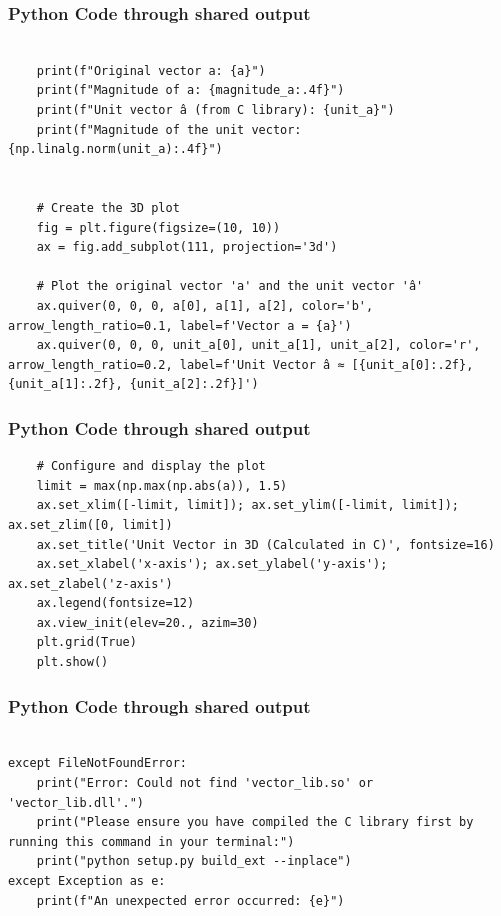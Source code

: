 \documentclass{beamer}
\begin{document}
\begin{frame}[fragile]
\frametitle{Python Code through shared output}
\begin{lstlisting}

    print(f"Original vector a: {a}")
    print(f"Magnitude of a: {magnitude_a:.4f}")
    print(f"Unit vector â (from C library): {unit_a}")
    print(f"Magnitude of the unit vector: {np.linalg.norm(unit_a):.4f}")
    

    # Create the 3D plot
    fig = plt.figure(figsize=(10, 10))
    ax = fig.add_subplot(111, projection='3d')

    # Plot the original vector 'a' and the unit vector 'â'
    ax.quiver(0, 0, 0, a[0], a[1], a[2], color='b', arrow_length_ratio=0.1, label=f'Vector a = {a}')
    ax.quiver(0, 0, 0, unit_a[0], unit_a[1], unit_a[2], color='r', arrow_length_ratio=0.2, label=f'Unit Vector â ≈ [{unit_a[0]:.2f}, {unit_a[1]:.2f}, {unit_a[2]:.2f}]')
\end{lstlisting}
\end{frame}  

\begin{frame}[fragile]
\frametitle{Python Code through shared output}
\begin{lstlisting}
    # Configure and display the plot
    limit = max(np.max(np.abs(a)), 1.5)
    ax.set_xlim([-limit, limit]); ax.set_ylim([-limit, limit]); ax.set_zlim([0, limit])
    ax.set_title('Unit Vector in 3D (Calculated in C)', fontsize=16)
    ax.set_xlabel('x-axis'); ax.set_ylabel('y-axis'); ax.set_zlabel('z-axis')
    ax.legend(fontsize=12)
    ax.view_init(elev=20., azim=30)
    plt.grid(True)
    plt.show()
    \end{lstlisting}
\end{frame}  

\begin{frame}[fragile]
\frametitle{Python Code through shared output}
\begin{lstlisting}

except FileNotFoundError:
    print("Error: Could not find 'vector_lib.so' or 'vector_lib.dll'.")
    print("Please ensure you have compiled the C library first by running this command in your terminal:")
    print("python setup.py build_ext --inplace")
except Exception as e:
    print(f"An unexpected error occurred: {e}")

\end{lstlisting}
\end{frame}  
\end{document}
